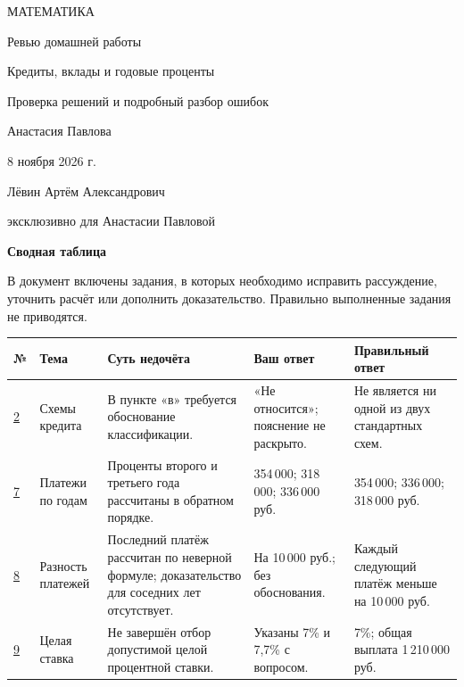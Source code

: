 \documentclass[a4paper,11pt]{article}
\begin{document}
\color{body}
\thispagestyle{empty}
\begin{center}
\vspace*{27mm}
{\small\color{deep}\MakeUppercase{Математика}}\par
\vspace{20mm}
{\LARGE Ревью домашней работы}\par
\vspace{12mm}
{\Large\color{accent}Кредиты, вклады и годовые проценты}\par
\vspace{12mm}
{\normalsize Проверка решений и подробный разбор ошибок}\par
\vfill
{\large Анастасия Павлова}\par
\vspace{9mm}
{8 ноября 2026 г.}\par
\vspace{15mm}
{\small Лёвин Артём Александрович}\par
{\small эксклюзивно для Анастасии Павловой}\par
\vspace{15mm}
\end{center}

\clearpage
{\Large\color{deep}\textbf{Сводная таблица}}\par
\vspace{2mm}
В документ включены задания, в которых необходимо исправить рассуждение,
уточнить расчёт или дополнить доказательство. Правильно выполненные задания не приводятся.

\vspace{5mm}
\small
\renewcommand{\arraystretch}{1.38}
\begin{tabularx}{\linewidth}{@{}p{12mm}p{25mm}X p{26mm}p{28mm}@{}}
\toprule
№ & Тема & Суть недочёта & Ваш ответ & Правильный ответ\\
\midrule
\hyperref[task:2]{2} & Схемы кредита &
В пункте «в» требуется обоснование классификации. &
«Не относится»; пояснение не раскрыто. &
Не является ни одной из двух стандартных схем.\\
\addlinespace
\hyperref[task:7]{7} & Платежи по годам &
Проценты второго и третьего года рассчитаны в обратном порядке. &
354\,000; 318\,000; 336\,000 руб. &
354\,000; 336\,000; 318\,000 руб.\\
\addlinespace
\hyperref[task:8]{8} & Разность платежей &
Последний платёж рассчитан по неверной формуле; доказательство для соседних лет отсутствует. &
На 10\,000 руб.; без обоснования. &
Каждый следующий платёж меньше на 10\,000 руб.\\
\addlinespace
\hyperref[task:9]{9} & Целая ставка &
Не завершён отбор допустимой целой процентной ставки. &
Указаны 7\% и 7{,}7\% с вопросом. &
7\%; общая выплата 1\,210\,000 руб.\\
\bottomrule
\end{tabularx}
\normalsize
\end{document}
